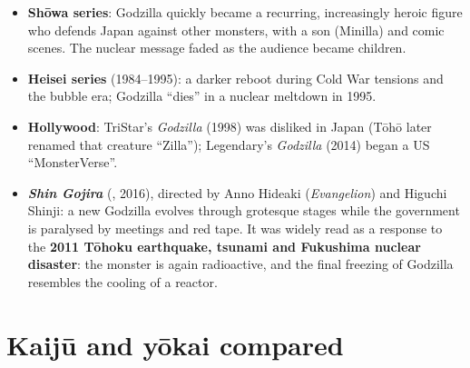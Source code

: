 \begin{center}
\end{center}

\begin{itemize}
  \item \textbf{Shōwa series}: Godzilla quickly became a recurring, increasingly
        heroic figure who defends Japan against other monsters, with a son (Minilla) and
        comic scenes. The nuclear message faded as the audience became children.
  \item \textbf{Heisei series} (1984--1995): a darker reboot during Cold War tensions and
        the bubble era; Godzilla ``dies'' in a nuclear meltdown in 1995.
  \item \textbf{Hollywood}: TriStar's \emph{Godzilla} (1998) was disliked in Japan (Tōhō
        later renamed that creature ``Zilla''); Legendary's \emph{Godzilla} (2014) began a
        US ``MonsterVerse''.
  \item \textbf{\emph{Shin Gojira}} (, 2016), directed by Anno Hideaki
        (\emph{Evangelion}) and Higuchi Shinji: a new Godzilla evolves through grotesque
        stages while the government is paralysed by meetings and red tape. It was widely
        read as a response to the \textbf{2011 Tōhoku earthquake, tsunami and Fukushima
        nuclear disaster}: the monster is again radioactive, and the final freezing of
        Godzilla resembles the cooling of a reactor.
\end{itemize}

\section{Kaijū and yōkai compared}

